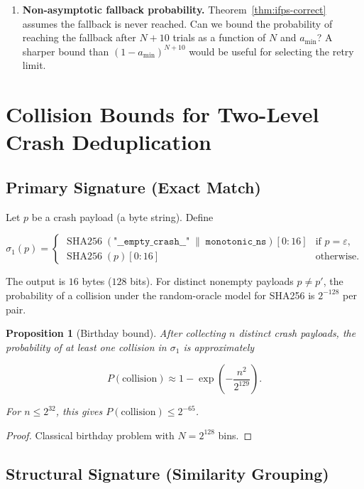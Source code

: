 \documentclass[11pt,a4paper]{article}
\newtheorem{proposition}{Proposition}
\begin{document}
\begin{enumerate}
  \item \textbf{Non-asymptotic fallback probability.}
        Theorem~\ref{thm:ifps-correct} assumes the fallback is never
        reached.  Can we bound the probability of reaching the fallback
        after $N+10$ trials as a function of $N$ and $a_{\min}$?
        A sharper bound than $(1 - a_{\min})^{N+10}$ would be useful
        for selecting the retry limit.
\end{enumerate}

\section{Collision Bounds for Two-Level Crash Deduplication}

\subsection{Primary Signature (Exact Match)}

Let $p$ be a crash payload (a byte string).  Define

\[
\sigma_1(p) =
\begin{cases}
\operatorname{SHA256}(\texttt{"\_\_empty\_crash\_\_"} \;\|\;
    \texttt{monotonic\_ns})[0:16] & \text{if } p = \varepsilon, \\[4pt]
\operatorname{SHA256}(p)[0:16]    & \text{otherwise}.
\end{cases}
\]

The output is $16$ bytes ($128$ bits).  For distinct nonempty payloads
$p \neq p'$, the probability of a collision under the random-oracle model
for SHA256 is $2^{-128}$ per pair.

\begin{proposition}[Birthday bound]
\label{prop:collision}
After collecting $n$ distinct crash payloads, the probability of at
least one collision in $\sigma_1$ is approximately

\[
P(\text{collision}) \approx 1 - \exp\!\left(-\frac{n^2}{2^{129}}\right).
\]

For $n \le 2^{32}$, this gives $P(\text{collision}) \le 2^{-65}$.
\end{proposition}

\begin{proof}
Classical birthday problem with $N = 2^{128}$ bins.
\end{proof}

\subsection{Structural Signature (Similarity Grouping)}
\end{document}
